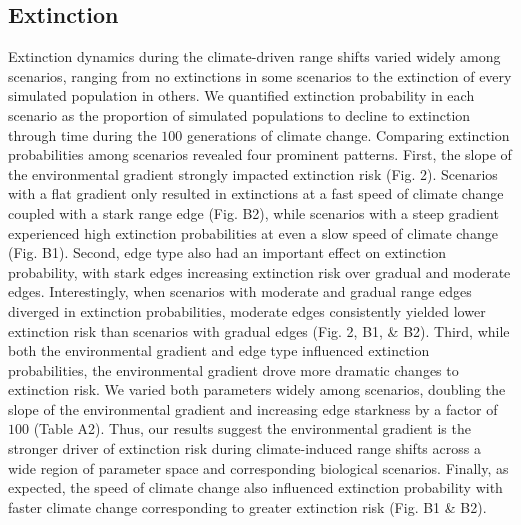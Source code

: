 \documentclass[11pt]{article}
\begin{document}
\subsection*{Extinction}
Extinction dynamics during the climate-driven range shifts varied widely among scenarios, ranging from no extinctions in some scenarios to the extinction of every simulated population in others. We quantified extinction probability in each scenario as the proportion of simulated populations to decline to extinction through time during the $100$ generations of climate change. Comparing extinction probabilities among scenarios revealed four prominent patterns. First, the slope of the environmental gradient strongly impacted extinction risk (Fig. 2). Scenarios with a flat gradient only resulted in extinctions at a fast speed of climate change coupled with a stark range edge (Fig. B2), while scenarios with a steep gradient experienced high extinction probabilities at even a slow speed of climate change (Fig. B1). Second, edge type also had an important effect on extinction probability, with stark edges increasing extinction risk over gradual and moderate edges. Interestingly, when scenarios with moderate and gradual range edges diverged in extinction probabilities, moderate edges consistently yielded lower extinction risk than scenarios with gradual edges (Fig. 2, B1, \& B2). Third, while both the environmental gradient and edge type influenced extinction probabilities, the environmental gradient drove more dramatic changes to extinction risk. We varied both parameters widely among scenarios, doubling the slope of the environmental gradient and increasing edge starkness by a factor of $100$ (Table A2). Thus, our results suggest the environmental gradient is the stronger driver of extinction risk during climate-induced range shifts across a wide region of parameter space and corresponding biological scenarios. Finally, as expected, the speed of climate change also influenced extinction probability with faster climate change corresponding to greater extinction risk (Fig. B1 \& B2).
\end{document}
